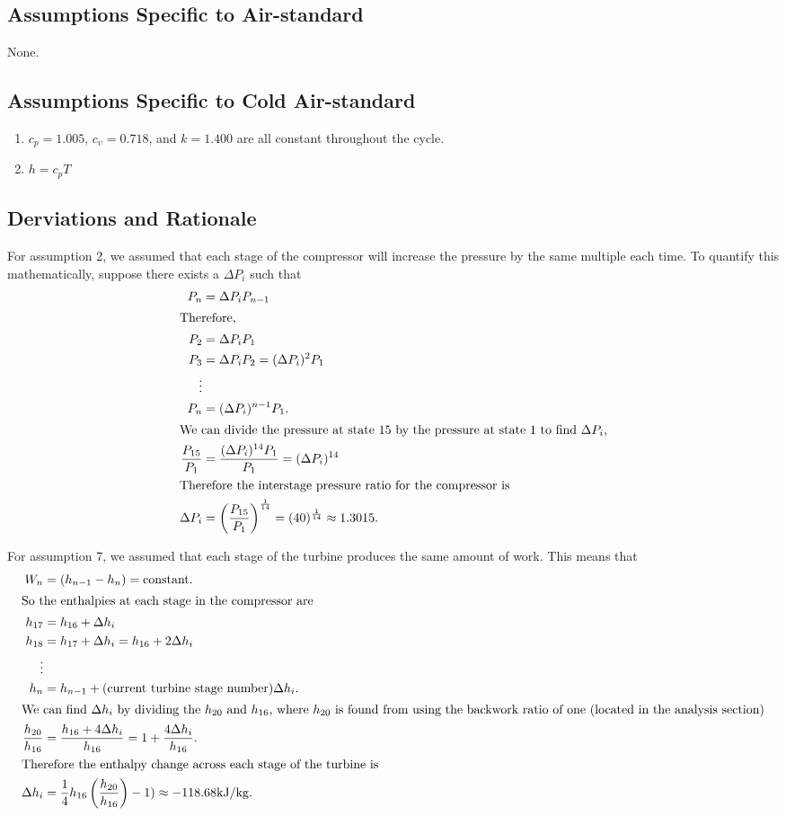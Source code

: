 \documentclass[11pt]{article} %
\begin{document}
\subsection*{Assumptions Specific to Air-standard}
None.

\subsection*{Assumptions Specific to Cold Air-standard}
\begin{enumerate}
\item $c_p = 1.005$, $c_{\upsilon} = 0.718$, and $k = 1.400$ are all constant throughout the cycle.
\item $h = c_pT$
\end{enumerate}

\subsection*{Derviations and Rationale}
For assumption 2, we assumed that each stage of the compressor will increase the pressure by the same multiple each time. To quantify this mathematically, suppose there exists a $\Delta P_i$ such that
\begin{align*}
P_n &= \Delta P_i P_{n-1} \\ \intertext{Therefore,}
P_{2} &= \Delta P_i P_{1} \\
P_{3} &= \Delta P_i P_{2} = (\Delta P_i)^2 P_{1} \\
\vdots \\
P_{n} &= (\Delta P_i)^{n-1} P_{1}. \\ \intertext{We can divide the pressure at state 15 by the pressure at state 1 to find $\Delta P_i$,}
\frac{P_{15}}{P_{1}} &= \frac{(\Delta P_i)^{14}P_{1}}{P_{1}} = (\Delta P_i)^{14}\\ \intertext{Therefore the interstage pressure ratio for the compressor is}
\Delta P_i &= \left(\frac{P_{15}}{P_{1}} \right)^{\frac{1}{14}} = (40)^{\frac{1}{14}} \approx 1.3015.
\end{align*}

For assumption 7, we assumed that each stage of the turbine produces the same amount of work. This means that 
\begin{align*}
W_n &= (h_{n-1} - h_n) = \text{constant}. \\ \intertext{So the enthalpies at each stage in the compressor are}
h_{17} &= h_{16} + \Delta h_i \\
h_{18} &= h_{17} + \Delta h_i = h_{16} + 2\Delta h_i \\
\vdots \\
h_{n} &= h_{n-1} + (\text{current turbine stage number})\Delta h_i. \\ \intertext{We can find $\Delta h_i$ by dividing the $h_{20}$ and $h_{16}$, where $h_{20}$ is found from using the backwork ratio of one (located in the analysis section)}
\frac{h_{20}}{h_{16}} &= \frac{h_{16} + 4\Delta h_i}{h_{16}} = 1 + \frac{4\Delta h_i}{h_{16}}. \\ \intertext{Therefore the enthalpy change across each stage of the turbine is}
\Delta h_i &= \frac{1}{4}h_{16}\left(\frac{h_{20}}{h_{16}} \right) -1) \approx -118.68 \si{kJ/kg}.
\end{align*}
\end{document}
